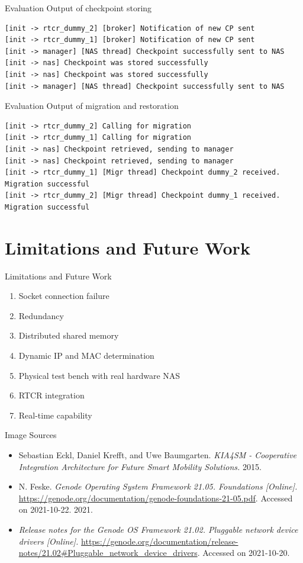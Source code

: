 \documentclass[
  english,            %
  aspectratio=169,    %
]{tumbeamer}
\begin{document}
\begin{frame}[fragile]{Evaluation}
Output of checkpoint storing
\begin{lstlisting}
[init -> rtcr_dummy_2] [broker] Notification of new CP sent
[init -> rtcr_dummy_1] [broker] Notification of new CP sent
[init -> manager] [NAS thread] Checkpoint successfully sent to NAS
[init -> nas] Checkpoint was stored successfully
[init -> nas] Checkpoint was stored successfully
[init -> manager] [NAS thread] Checkpoint successfully sent to NAS
\end{lstlisting}
\end{frame}

\begin{frame}[fragile]{Evaluation}
Output of migration and restoration
\begin{lstlisting}
[init -> rtcr_dummy_2] Calling for migration
[init -> rtcr_dummy_1] Calling for migration
[init -> nas] Checkpoint retrieved, sending to manager
[init -> nas] Checkpoint retrieved, sending to manager
[init -> rtcr_dummy_1] [Migr thread] Checkpoint dummy_2 received. Migration successful
[init -> rtcr_dummy_2] [Migr thread] Checkpoint dummy_1 received. Migration successful
\end{lstlisting}
\end{frame}




\section{Limitations and Future Work}
\begin{frame}{Limitations and Future Work}
\begin{enumerate}
    \item Socket connection failure
    \item Redundancy
    \item Distributed shared memory
    \item Dynamic IP and MAC determination
    \item Physical test bench with real hardware NAS
    \item RTCR integration
    \item Real-time capability
\end{enumerate}
\end{frame}

\begin{frame}{Image Sources}
\begin{itemize}
    \item [1] Sebastian Eckl, Daniel Krefft, and Uwe Baumgarten. \textit{KIA4SM - Cooperative Integration Architecture for Future Smart Mobility Solutions.} 2015.
    \item [2] N. Feske. \textit{Genode Operating System Framework 21.05. Foundations [Online].} \url{https://genode.org/documentation/genode-foundations-21-05.pdf}. Accessed on 2021-10-22. 2021.
    \item [3] \textit{Release notes for the Genode OS Framework 21.02. Pluggable network device drivers [Online].} \url{https://genode.org/documentation/release-notes/21.02#Pluggable_network_device_drivers}. Accessed on 2021-10-20.
\end{itemize}
\end{frame}
\end{document}
